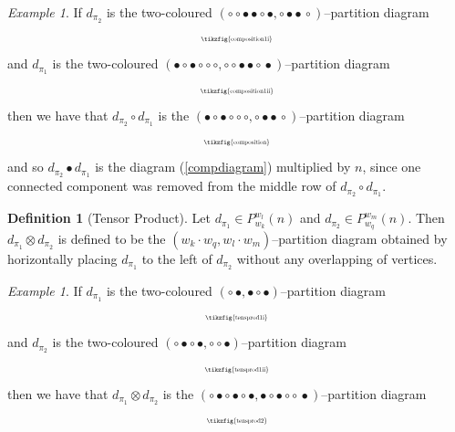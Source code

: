 \documentclass{article}
\theoremstyle{plain}
\theoremstyle{definition}
\newtheorem{definition}[theorem]{Definition}
\theoremstyle{remark}
\newtheorem{example}[theorem]{Example}
\begin{document}
\begin{example}
If $d_{\pi_2}$ is the two-coloured 
$(\circ \circ \bullet \bullet \circ \, \bullet, 
\circ \bullet \bullet \, \circ)$--partition diagram 
\begin{equation}
\begin{aligned}
	\scalebox{0.5}{\tikzfig{composition1i}}
\end{aligned}
\end{equation}
and
$d_{\pi_1}$ is the two-coloured 
$(\bullet \circ \bullet \circ \circ \, \circ, 
\circ \circ \bullet \bullet \circ \, \bullet)$--partition diagram 
\begin{equation}
\begin{aligned}
	\scalebox{0.5}{\tikzfig{composition1ii}}
\end{aligned}
\end{equation}
then
we have that $d_{\pi_2} \circ d_{\pi_1}$ is 
the 
$(\bullet \circ \bullet \circ \circ \, \circ,
\circ \bullet \bullet \, \circ)$--partition diagram
\begin{equation} \label{compdiagram}
\begin{aligned}
	\scalebox{0.5}{\tikzfig{composition}}
\end{aligned}
\end{equation}
and so $d_{\pi_2} \bullet d_{\pi_1}$ is the diagram (\ref{compdiagram}) multiplied by $n$, since one connected component was removed from the middle row of $d_{\pi_2} \circ d_{\pi_1}$.
\end{example}
		
\begin{definition}[Tensor Product] \label{qgrouptensorprod}
Let $d_{\pi_1} \in P_{w_k}^{w_l}(n)$ and $d_{\pi_2} \in P_{w_q}^{w_m}(n)$. Then $d_{\pi_1} \otimes d_{\pi_2}$ is defined to be the $(w_k \cdot w_q, w_l \cdot w_m)$--partition diagram obtained by horizontally placing $d_{\pi_1}$ to the left of $d_{\pi_2}$ without any overlapping of vertices.
\end{definition}

\begin{example}
If $d_{\pi_1}$ is the two-coloured 
$(\circ \, \bullet, 
\bullet \circ \bullet)$--partition diagram 
\begin{equation}
\begin{aligned}
	\scalebox{0.5}{\tikzfig{tensprod1i}}
\end{aligned}
\end{equation}
and
$d_{\pi_2}$ is the two-coloured 
$(\circ \bullet \circ \, \bullet, 
\circ \circ \bullet)$--partition diagram 
\begin{equation}
\begin{aligned}
	\scalebox{0.5}{\tikzfig{tensprod1ii}}
\end{aligned}
\end{equation}
then
we have that $d_{\pi_1} \otimes d_{\pi_2}$ is the 
$(\circ \bullet \circ \bullet \circ \, \bullet,
\bullet \circ \bullet \circ \circ \, \bullet)$--partition diagram
\begin{equation}
\begin{aligned}
	\scalebox{0.5}{\tikzfig{tensprod2}}
\end{aligned}
\end{equation}
\end{example}
\end{document}
